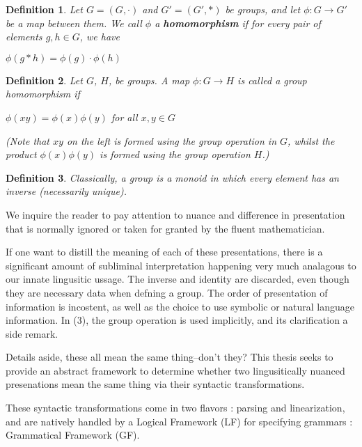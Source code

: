 \documentclass[11pt, a4paper]{article}
\newtheorem{definition}{Definition}
\begin{document}

\begin{definition}
Let $G = (G,\cdot)$ and $G' = (G',\ast)$ be groups, and let $\phi : G \to G'$ be a map between them. We call $\phi$ a \textbf{homomorphism} if for every pair of elements $g, h \in G$, we have 
\begin{center}
  $\phi(g \ast h) = \phi ( g ) \cdot \phi ( h )$ 
\end{center}
\end{definition}


\begin{definition}
Let $G$, $H$, be groups.  A map $\phi : G \to H$ is called a \emph{group homomorphism} if
\begin{center}
  $\phi(xy) = \phi ( x ) \phi ( y )$ for all $x, y \in G$ 
\end{center}
(Note that $xy$ on the left is formed using the group operation in $G$, whilst the product $\phi ( x ) \phi ( y )$ is formed using the group operation $H$.)
\end{definition}


\begin{definition}
Classically, a group is a monoid in which every element has an inverse (necessarily unique).
\end{definition}

We inquire the reader to pay attention to nuance and difference in presentation
that is normally ignored or taken for granted by the fluent mathematician.

If one want to distill the meaning of each of these presentations, there is a
significant amount of subliminal interpretation happening very much analagous
to our innate lingusitic ussage.  The inverse and identity are discarded, even
though they are necessary data when defning a group. The order of presentation
of information is incostent, as well as the choice to use symbolic or natural
language information. In (3), the group operation is used implicitly, and its
clarification a side remark.

Details aside, these all mean the same thing--don't they?  This thesis seeks to provide an
abstract framework to determine whether two lingusitically nuanced presenations
mean the same thing via their syntactic transformations. 

These syntactic transformations come in two flavors : parsing and
linearization, and are natively handled by a Logical Framework (LF) for
specifying grammars : Grammatical Framework (GF).
\end{document}
